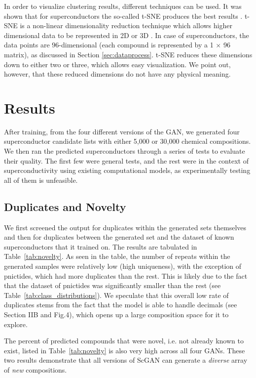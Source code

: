 In order to visualize clustering results, different techniques can be used. It was shown that for 
superconductors the so-called t-SNE produces the best results \cite{ROTER20221354078}.
t-SNE is a non-linear dimensionality reduction
technique which allows higher dimensional data to be represented in 2D or 3D \cite{vanDerMaaten2008}. 
In case of superconductors, the data points are $96$-dimensional (each compound is represented by a 1 $\times$ 96 matrix), 
as discussed in Section \ref{sec:dataprocess}. t-SNE reduces these dimensions down to either two or three, which allows easy visualization.  
We point out, however, that these reduced dimensions do not have any physical meaning. 

\section{Results}
\label{results}

After training, from the four different versions of the GAN, we generated four superconductor candidate lists with either 5,000 or 30,000 chemical compositions. We then ran the predicted superconductors through a series of tests to evaluate their quality. The first few were general tests, and the rest were in the context of superconductivity using existing computational models, as experimentally testing all of them is unfeasible.

\subsection{Duplicates and Novelty}

We first screened the output for duplicates within the generated sets themselves and then for duplicates between the generated set and the dataset of known superconductors that it trained on. The results are tabulated in Table~\ref{tab:novelty}. As seen in the table, the number of repeats within the generated samples were relatively low (high uniqueness), with the exception of pnictides, which had more duplicates than the rest. This is likely due to the fact that the dataset of pnictides was significantly smaller than the rest (see Table~\ref{tab:class_distributions}). We speculate that this overall low rate of duplicates stems from the fact that the model is able to handle decimals (see Section IIB and Fig.4), which opens up a large composition space for it to explore.

The percent of predicted compounds that were novel, i.e. not already known to exist, listed in Table~\ref{tab:novelty} is also very high across all four GANs. These two results demonstrate that all versions of ScGAN can generate a \textit{diverse} array of \textit{new} compositions. 

